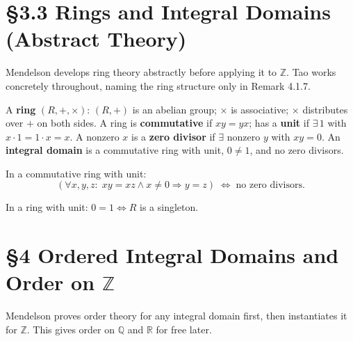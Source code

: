 \section*{§3.3 \quad Rings and Integral Domains (Abstract Theory)}

\begin{remark}
Mendelson develops ring theory abstractly before applying it to $\mathbb{Z}$.
Tao works concretely throughout, naming the ring structure only in
Remark 4.1.7.
\end{remark}

\begin{tcolorbox}[colback=corbox, colframe=corborder, arc=2pt,
  left=6pt, right=6pt, top=4pt, bottom=4pt,
  title={\small\textbf{Definition 3.5 (Ring; integral domain)}},
  fonttitle=\small\bfseries]
A \textbf{ring} $(R,+,\times)$: $(R,+)$ is an abelian group;
$\times$ is associative; $\times$ distributes over $+$ on both sides.
A ring is \textbf{commutative} if $xy=yx$;
has a \textbf{unit} if $\exists\,1$ with $x\cdot 1=1\cdot x=x$.
A nonzero $x$ is a \textbf{zero divisor} if $\exists$ nonzero $y$
with $xy=0$.
An \textbf{integral domain} is a commutative ring with unit,
$0 \neq 1$, and no zero divisors.
\end{tcolorbox}

\begin{theorem}
\label{thm:men-cancel-equiv}
In a commutative ring with unit:
\[
(\forall x,y,z:\; xy=xz \wedge x\neq 0 \Rightarrow y=z)
\;\Longleftrightarrow\;
\text{no zero divisors.}
\]
\end{theorem}

\begin{theorem}
\label{thm:men-trivial}
In a ring with unit: $0=1 \Longleftrightarrow R$ is a singleton.
\end{theorem}

\section*{§4 \quad Ordered Integral Domains and Order on $\mathbb{Z}$}

\begin{remark}[Strategy]
Mendelson proves order theory for any integral domain first, then
instantiates it for $\mathbb{Z}$.
This gives order on $\mathbb{Q}$ and $\mathbb{R}$ for free later.
\end{remark}

